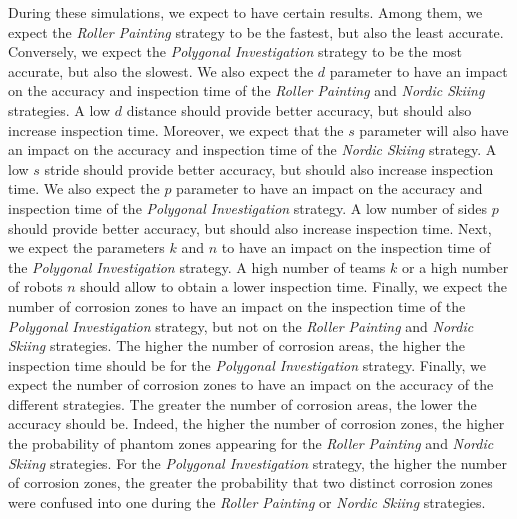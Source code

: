 During these simulations, we expect to have certain results.
Among them, we expect the \textit{Roller Painting} strategy to be the fastest, but also the least accurate.
Conversely, we expect the \textit{Polygonal Investigation} strategy to be the most accurate, but also the slowest.
We also expect the $d$ parameter to have an impact on the accuracy and inspection time of the \textit{Roller Painting} and \textit{Nordic Skiing} strategies.
A low $d$ distance should provide better accuracy, but should also increase inspection time.
Moreover, we expect that the $s$ parameter will also have an impact on the accuracy and inspection time of the \textit{Nordic Skiing} strategy.
A low $s$ stride should provide better accuracy, but should also increase inspection time.
We also expect the $p$ parameter to have an impact on the accuracy and inspection time of the \textit{Polygonal Investigation} strategy.
A low number of sides $p$ should provide better accuracy, but should also increase inspection time.
Next, we expect the parameters $k$ and $n$ to have an impact on the inspection time of the \textit{Polygonal Investigation} strategy.
A high number of teams $k$ or a high number of robots $n$ should allow to obtain a lower inspection time.
Finally, we expect the number of corrosion zones to have an impact on the inspection time of the \textit{Polygonal Investigation} strategy, but not on the \textit{Roller Painting} and \textit{Nordic Skiing} strategies.
The higher the number of corrosion areas, the higher the inspection time should be for the \textit{Polygonal Investigation} strategy.
Finally, we expect the number of corrosion zones to have an impact on the accuracy of the different strategies.
The greater the number of corrosion areas, the lower the accuracy should be.
Indeed, the higher the number of corrosion zones, the higher the probability of phantom zones appearing for the \textit{Roller Painting} and \textit{Nordic Skiing} strategies.
For the \textit{Polygonal Investigation} strategy, the higher the number of corrosion zones, the greater the probability that two distinct corrosion zones were confused into one during the \textit{Roller Painting} or \textit{Nordic Skiing} strategies.


